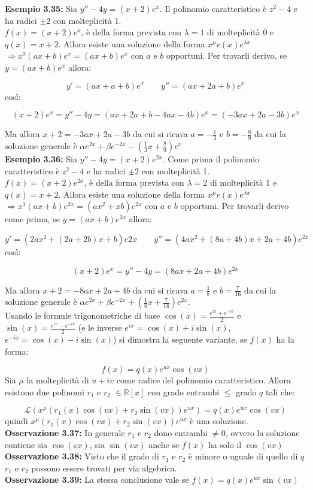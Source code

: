 \documentclass[a4paper,11pt,titlepage]{book}
\begin{document}
\textbf{Esempio 3.35:} Sia $y''-4y=(x+2)e^x$. Il polinomio caratteristico è $z^2-4$ e ha radici $\pm 2$ con molteplicità 1.\\

$f(x)=(x+2)e^x$, è della forma prevista con $\lambda=1$ di molteplicità 0 e $q(x)=x+2$. Allora esiste una soluzione della forma $x^\mu r(x)e^{\lambda x}$ $\Rightarrow x^0(ax+b)e^x=(ax+b)e^x$ con $a$ e $b$ opportuni. Per trovarli derivo, se $y=(ax+b)e^x$ allora:

$$y'=(ax+a+b)e^x\qquad y''=(ax+2a+b)e^x$$
così:

$$(x+2)e^x=y''-4y=(ax+2a+b-4ax-4b)e^x=(-3ax+2a-3b)e^x$$

Ma allora $x+2=-3ax+2a-3b$ da cui si ricava $a=-\frac{1}{3}$ e $b=-\frac{8}{9}$ da cui la soluzione generale è $\alpha e^{2x}+\beta e^{-2x}-(\frac{1}{3}x+\frac{8}{9})e^x$\\

\textbf{Esempio 3.36:} Sia $y''-4y=(x+2)e^{2x}$. Come prima il polinomio caratteristico è $z^2-4$ e ha radici $\pm 2$ con molteplicità 1.\\

$f(x)=(x+2)e^{2x}$, è della forma prevista con $\lambda=2$ di molteplicità 1 e $q(x)=x+2$. Allora esiste una soluzione della forma $x^\mu r(x)e^{\lambda x}$ $\Rightarrow x^1(ax+b)e^{2x}=(ax^2+xb)e^{2x}$ con $a$ e $b$ opportuni. Per trovarli derivo come prima, se $y=(ax+b)e^{2x}$ allora:

$$y'=(2ax^2+(2a+2b)x+b)e{2x}\qquad y''=(4ax^2+(8a+4b)x+2a+4b)e^{2x}$$
così:

$$(x+2)e^x=y''-4y=(8ax+2a+4b)e^{2x}$$

Ma allora $x+2=-8ax+2a+4b$ da cui si ricava $a=\frac{1}{8}$ e $b=\frac{7}{16}$ da cui la soluzione generale è $\alpha e^{2x}+\beta e^{-2x}+(\frac{1}{8}x+\frac{7}{16})e^{2x}$.\\

Usando le formule trigonometriche di base $\cos(x)=\frac{e^{ix}+e^{-iv}}{2}$ e $\sin(x)=\frac{e^{ix}-e^{-iv}}{2}$ (e le inverse $e^{ix}=\cos(x)+i\sin(x)$, $e^{-ix}=\cos(x)-i\sin(x)$) si dimostra la seguente variante, se $f(x)$ ha la forma:

$$f(x)=q(x)e^{ux}\cos(vx)$$
Sia $\mu$ la molteplicità di $u+iv$ come radice del polinomio caratteristico. Allora esistono due polinomi $r_1$ e $r_2$ $\in\mathbb{R}[x]$ con grado entrambi $\leq$ grado $q$ tali che:

$$\mathcal{L}(x^\mu(r_1(x)\cos(vx)+r_2\sin(vx))e^{ux})=q(x)e^{ux}\cos(vx)$$
quindi $x^\mu(r_1(x)\cos(vx)+r_2\sin(vx))e^{ux}$ è una soluzione.\\

\textbf{Osservazione 3.37:} In generale $r_1$ e $r_2$ dono entrambi $\ne 0$, ovvero la soluzione contiene sia $\cos(vx)$, sia $\sin(vx)$ anche se $f(x)$ ha solo il $\cos(vx)$\\

\textbf{Osservazione 3.38:} Visto che il grado di $r_1$ e $r_2$ è minore o uguale di quello di $q$ $r_1$ e $r_2$ possono essere trovati per via algebrica. \\

\textbf{Osservazione 3.39:} La stessa conclusione vale se $f(x)=q(x)e^{ux}\sin(vx)$\\
\end{document}
